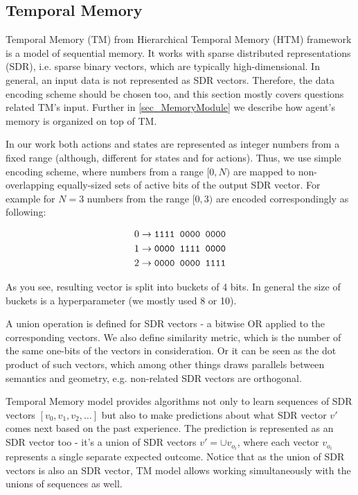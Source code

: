 \documentclass[a4paper,twoside]{article}
\begin{document}
\subsection{Temporal Memory} \label{sec_TM}

Temporal Memory (TM) from Hierarchical Temporal Memory (HTM) framework is a model of sequential memory. It works with sparse distributed representations (SDR), i.e. sparse binary vectors, which are typically high-dimensional. In general, an input data is not represented as SDR vectors. Therefore, the data encoding scheme should be chosen too, and this section mostly covers questions related TM's input. Further in \ref{sec_MemoryModule} we describe how agent's memory is organized on top of TM.

In our work both actions and states are represented as integer numbers from a fixed range (although, different for states and for actions). Thus, we use simple encoding scheme, where numbers from a range $[0, N)$ are mapped to non-overlapping equally-sized sets of active bits of the output SDR vector. For example for $N = 3$ numbers from the range $[0, 3)$ are encoded correspondingly as following:

$$
\begin{aligned}
  0 & \rightarrow \verb|1111 0000 0000| \\
  1 & \rightarrow \verb|0000 1111 0000| \\
  2 & \rightarrow \verb|0000 0000 1111| \\
\end{aligned}
$$

As you see, resulting vector is split into buckets of 4 bits. In general the size of buckets is a hyperparameter (we mostly used 8 or 10).

A union operation is defined for SDR vectors - a bitwise OR applied to the corresponding vectors. We also define similarity metric, which is the number of the same one-bits of the vectors in consideration. Or it can be seen as the dot product of such vectors, which among other things draws parallels between semantics and geometry, e.g. non-related SDR vectors are orthogonal.

Temporal Memory model provides algorithms not only to learn sequences of SDR vectors $[v_0, v_1, v_2, \dots ]$ but also to make predictions about what SDR vector $v'$ comes next based on the past experience. The prediction is represented as an SDR vector too - it's a union of SDR vectors $v' = \cup v_{o_i}$, where each vector $v_{o_i}$ represents a single separate expected outcome. Notice that as the union of SDR vectors is also an SDR vector, TM model allows working simultaneously with the unions of sequences as well.
\end{document}
